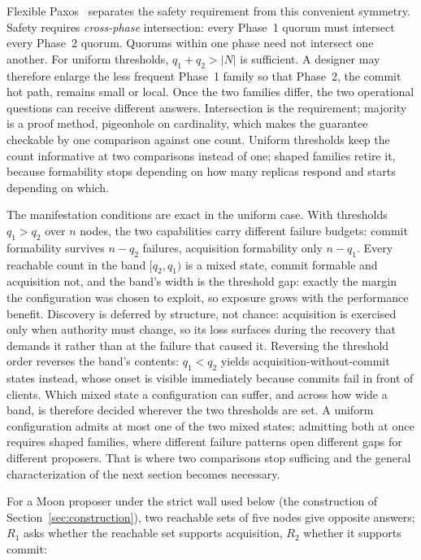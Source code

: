 \documentclass[letterpaper,twocolumn,10pt]{article}
\newcounter{prop}
\begin{document}
Flexible Paxos~\cite{howard2016} separates the safety requirement from this convenient symmetry. Safety requires \emph{cross-phase} intersection: every Phase~1 quorum must intersect every Phase~2 quorum. Quorums within one phase need not intersect one another. For uniform thresholds, $q_1+q_2 > |N|$ is sufficient. A designer may therefore enlarge the less frequent Phase~1 family so that Phase~2, the commit hot path, remains small or local. Once the two families differ, the two operational questions can receive different answers. Intersection is the requirement; majority is a proof method, pigeonhole on cardinality, which makes the guarantee checkable by one comparison against one count. Uniform thresholds keep the count informative at two comparisons instead of one; shaped families retire it, because formability stops depending on how many replicas respond and starts depending on which.

The manifestation conditions are exact in the uniform case. With thresholds $q_1 > q_2$ over $n$ nodes, the two capabilities carry different failure budgets: commit formability survives $n - q_2$ failures, acquisition formability only $n - q_1$. Every reachable count in the band $[q_2, q_1)$ is a mixed state, commit formable and acquisition not, and the band's width is the threshold gap: exactly the margin the configuration was chosen to exploit, so exposure grows with the performance benefit. Discovery is deferred by structure, not chance: acquisition is exercised only when authority must change, so its loss surfaces during the recovery that demands it rather than at the failure that caused it. Reversing the threshold order reverses the band's contents: $q_1 < q_2$ yields acquisition-without-commit states instead, whose onset is visible immediately because commits fail in front of clients. Which mixed state a configuration can suffer, and across how wide a band, is therefore decided wherever the two thresholds are set. A uniform configuration admits at most one of the two mixed states; admitting both at once requires shaped families, where different failure patterns open different gaps for different proposers. That is where two comparisons stop sufficing and the general characterization of the next section becomes necessary.

For a Moon proposer under the strict wall used below (the construction of Section~\ref{sec:construction}), two reachable sets of five nodes give opposite answers; $R_1$ asks whether the reachable set supports acquisition, $R_2$ whether it supports commit:
\end{document}
